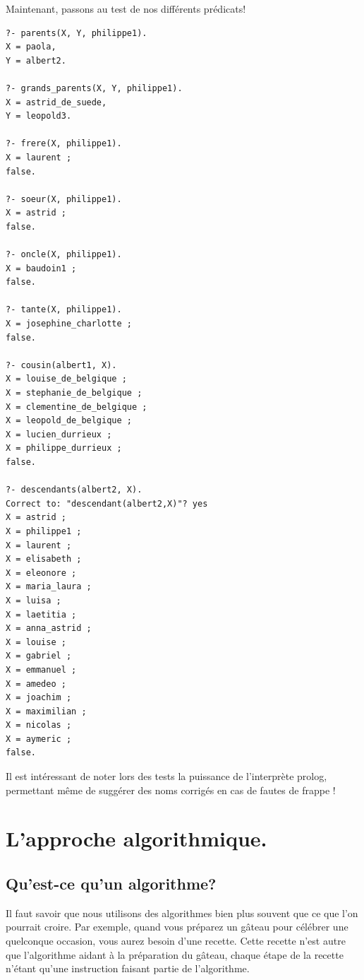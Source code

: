 \documentclass[a4paper, 12pt]{article}
\numberwithin{equation}{subsection}
\begin{document}
Maintenant, passons au test de nos différents prédicats!
\begin{lstlisting}
?- parents(X, Y, philippe1).
X = paola,
Y = albert2.

?- grands_parents(X, Y, philippe1).
X = astrid_de_suede,
Y = leopold3.

?- frere(X, philippe1).
X = laurent ;
false.

?- soeur(X, philippe1).
X = astrid ;
false.

?- oncle(X, philippe1).
X = baudoin1 ;
false.

?- tante(X, philippe1).
X = josephine_charlotte ;
false.

?- cousin(albert1, X).
X = louise_de_belgique ;
X = stephanie_de_belgique ;
X = clementine_de_belgique ;
X = leopold_de_belgique ;
X = lucien_durrieux ;
X = philippe_durrieux ;
false.

?- descendants(albert2, X).
Correct to: "descendant(albert2,X)"? yes
X = astrid ;
X = philippe1 ;
X = laurent ;
X = elisabeth ;
X = eleonore ;
X = maria_laura ;
X = luisa ;
X = laetitia ;
X = anna_astrid ;
X = louise ;
X = gabriel ;
X = emmanuel ;
X = amedeo ;
X = joachim ;
X = maximilian ;
X = nicolas ;
X = aymeric ;
false.
\end{lstlisting}
Il est intéressant de noter lors des tests la puissance de l'interprète prolog, permettant même de suggérer des noms corrigés en cas de fautes de frappe !
\newpage
\section{L'approche algorithmique.}
\subsection{Qu'est-ce qu'un algorithme?}
\begin{center}
\end{center}

Il faut savoir que nous utilisons des algorithmes bien plus souvent que ce que l'on pourrait croire. Par exemple, quand vous préparez un gâteau pour célébrer une quelconque occasion, vous aurez besoin d'une recette. Cette recette n'est autre que l'algorithme aidant à la préparation du gâteau, chaque étape de la recette n'étant qu'une instruction faisant partie de l'algorithme. \\
\end{document}

